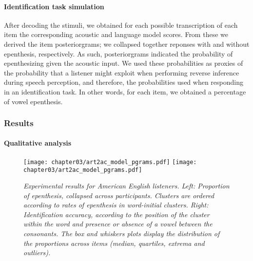 {\paragraph{Identification task simulation}
After decoding the stimuli, we obtained for each possible transcription of each item the corresponding acoustic and language model scores. From these we derived the item posteriorgrams; we collapsed together reponses with and without epenthesis, respectively. As such, posteriorgrams indicated the probability of epenthesizing \textipa{[@]} given the acoustic input. We used these probabilities as proxies of the probability that a listener might exploit when performing reverse inference during speech perception, and therefore, the probabilities used when responding in an identification task. In other words, for each item, we obtained a percentage of vowel epenthesis.

\subsubsection{Results}
  
\paragraph{Qualitative analysis}

\begin{figure}[htb!]
  \centering
    \texttt{[image: chapter03/art2ac\_model\_pgrams.pdf]}%
    \hspace{0.5cm}
    \texttt{[image: chapter03/art2ac\_model\_pgrams.pdf]}
    \caption{\textit{Experimental results for American English listeners.
      Left: Proportion of epenthesis, collapsed across participants. Clusters are ordered according to rates of epenthesis in word-initial clusters. 
      Right: Identification accuracy, according to the position of the cluster within the word and presence or absence of a vowel between the consonants. The box and whiskers plots display the distribution of the proportions across items (median, quartiles, extrema and outliers).}}
    \label{fig:wpd-hum}
  \end{figure}

}
